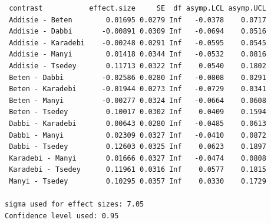 \documentclass[
  letterpaper,
  DIV=11,
  numbers=noendperiod]{scrartcl}
\begin{document}
\begin{verbatim}
 contrast           effect.size     SE  df asymp.LCL asymp.UCL
 Addisie - Beten        0.01695 0.0279 Inf   -0.0378    0.0717
 Addisie - Dabbi       -0.00891 0.0309 Inf   -0.0694    0.0516
 Addisie - Karadebi    -0.00248 0.0291 Inf   -0.0595    0.0545
 Addisie - Manyi        0.01418 0.0344 Inf   -0.0532    0.0816
 Addisie - Tsedey       0.11713 0.0322 Inf    0.0540    0.1802
 Beten - Dabbi         -0.02586 0.0280 Inf   -0.0808    0.0291
 Beten - Karadebi      -0.01944 0.0273 Inf   -0.0729    0.0341
 Beten - Manyi         -0.00277 0.0324 Inf   -0.0664    0.0608
 Beten - Tsedey         0.10017 0.0302 Inf    0.0409    0.1594
 Dabbi - Karadebi       0.00643 0.0280 Inf   -0.0485    0.0613
 Dabbi - Manyi          0.02309 0.0327 Inf   -0.0410    0.0872
 Dabbi - Tsedey         0.12603 0.0325 Inf    0.0623    0.1897
 Karadebi - Manyi       0.01666 0.0327 Inf   -0.0474    0.0808
 Karadebi - Tsedey      0.11961 0.0316 Inf    0.0577    0.1815
 Manyi - Tsedey         0.10295 0.0357 Inf    0.0330    0.1729

sigma used for effect sizes: 7.05 
Confidence level used: 0.95 
\end{verbatim}
\end{document}
